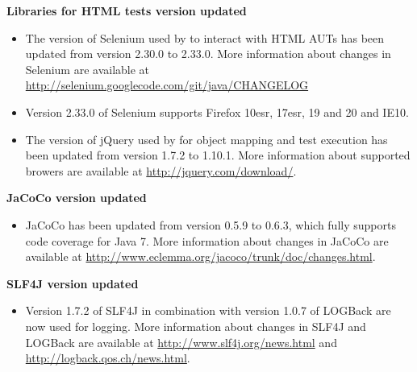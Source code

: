 \textbf{Libraries for HTML tests version updated}
\begin{itemize}
\item The version of Selenium used by \ite to interact with HTML AUTs has been
    updated from version 2.30.0 to 2.33.0. More information about changes
    in Selenium are available at
    \url{http://selenium.googlecode.com/git/java/CHANGELOG}
\item Version 2.33.0 of Selenium supports Firefox 10esr, 17esr, 19 and 20 and IE10.  
\item The version of jQuery used by \ite for object mapping and test execution
    has been updated from version 1.7.2 to 1.10.1. More information about
    supported browers are available at \url{http://jquery.com/download/}.
\end{itemize}

\textbf{JaCoCo version updated}
\begin{itemize}
\item JaCoCo has been updated from version 0.5.9 to 0.6.3, which fully supports
    code coverage for Java 7. More information about changes in JaCoCo are
    available at
    \url{http://www.eclemma.org/jacoco/trunk/doc/changes.html}.
\end{itemize}

\textbf{SLF4J version updated}
\begin{itemize}
\item Version 1.7.2 of SLF4J in combination with version 1.0.7 of LOGBack
    are now used for logging. More information about changes in SLF4J and
    LOGBack are available at
    \url{http://www.slf4j.org/news.html} and
    \url{http://logback.qos.ch/news.html}.
\end{itemize}
